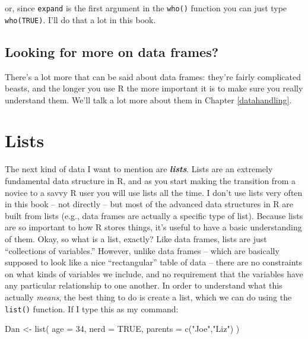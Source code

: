\documentclass[
]{book}
\newenvironment{Shaded}{\begin{snugshade}}{\end{snugshade}}
\newcommand{\AttributeTok}[1]{\textcolor[rgb]{0.77,0.63,0.00}{#1}}
\newcommand{\ConstantTok}[1]{\textcolor[rgb]{0.00,0.00,0.00}{#1}}
\newcommand{\DecValTok}[1]{\textcolor[rgb]{0.00,0.00,0.81}{#1}}
\newcommand{\FunctionTok}[1]{\textcolor[rgb]{0.00,0.00,0.00}{#1}}
\newcommand{\NormalTok}[1]{#1}
\newcommand{\OtherTok}[1]{\textcolor[rgb]{0.56,0.35,0.01}{#1}}
\newcommand{\StringTok}[1]{\textcolor[rgb]{0.31,0.60,0.02}{#1}}
\begin{document}
or, since \texttt{expand} is the first argument in the \texttt{who()} function you can just type \texttt{who(TRUE)}. I'll do that a lot in this book.

\hypertarget{looking-for-more-on-data-frames}{%
\subsection{Looking for more on data frames?}\label{looking-for-more-on-data-frames}}

There's a lot more that can be said about data frames: they're fairly complicated beasts, and the longer you use R the more important it is to make sure you really understand them. We'll talk a lot more about them in Chapter \ref{datahandling}.

\hypertarget{lists}{%
\section{Lists}\label{lists}}

The next kind of data I want to mention are \textbf{\emph{lists}}. Lists are an extremely fundamental data structure in R, and as you start making the transition from a novice to a savvy R user you will use lists all the time. I don't use lists very often in this book -- not directly -- but most of the advanced data structures in R are built from lists (e.g., data frames are actually a specific type of list). Because lists are so important to how R stores things, it's useful to have a basic understanding of them. Okay, so what is a list, exactly? Like data frames, lists are just ``collections of variables.'' However, unlike data frames -- which are basically supposed to look like a nice ``rectangular'' table of data -- there are no constraints on what kinds of variables we include, and no requirement that the variables have any particular relationship to one another. In order to understand what this actually \emph{means}, the best thing to do is create a list, which we can do using the \texttt{list()} function. If I type this as my command:

\begin{Shaded}
\begin{Highlighting}[]
\NormalTok{Dan }\OtherTok{\textless{}{-}} \FunctionTok{list}\NormalTok{( }\AttributeTok{age =} \DecValTok{34}\NormalTok{,}
            \AttributeTok{nerd =} \ConstantTok{TRUE}\NormalTok{,}
            \AttributeTok{parents =} \FunctionTok{c}\NormalTok{(}\StringTok{"Joe"}\NormalTok{,}\StringTok{"Liz"}\NormalTok{) }
\NormalTok{)}
\end{Highlighting}
\end{Shaded}
\end{document}
